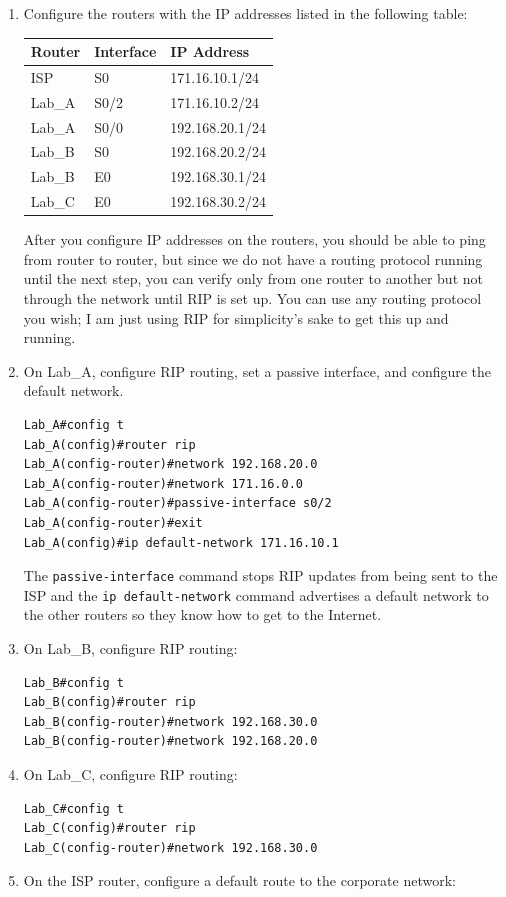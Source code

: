 \documentclass[b5paper,11pt]{memoir}
\begin{document}
\begin{enumerate}
\item
  Configure the routers with the IP addresses listed in the following
  table:

  \begin{longtable}[]{@{}lll@{}}
  \toprule
  \textbf{Router} & \textbf{Interface} & \textbf{IP
  Address}\tabularnewline
  \midrule
  \endhead
  ISP & S0 & 171.16.10.1/24\tabularnewline
  Lab\_A & S0/2 & 171.16.10.2/24\tabularnewline
  Lab\_A & S0/0 & 192.168.20.1/24\tabularnewline
  Lab\_B & S0 & 192.168.20.2/24\tabularnewline
  Lab\_B & E0 & 192.168.30.1/24\tabularnewline
  Lab\_C & E0 & 192.168.30.2/24\tabularnewline
  \bottomrule
  \end{longtable}

  After you configure IP addresses on the routers, you should be able to
  ping from router to router, but since we do not have a routing
  protocol running until the next step, you can verify only from one
  router to another but not through the network until RIP is set up. You
  can use any routing protocol you wish; I am just using RIP for
  simplicity's sake to get this up and running.
\item
  On Lab\_A, configure RIP routing, set a passive interface, and
  configure the default network.

\begin{verbatim}
Lab_A#config t
Lab_A(config)#router rip
Lab_A(config-router)#network 192.168.20.0
Lab_A(config-router)#network 171.16.0.0
Lab_A(config-router)#passive-interface s0/2
Lab_A(config-router)#exit
Lab_A(config)#ip default-network 171.16.10.1
\end{verbatim}

  The \texttt{passive-interface} command stops RIP updates from being
  sent to the ISP and the \texttt{ip\ default-network} command
  advertises a default network to the other routers so they know how to
  get to the Internet.
\item
  On Lab\_B, configure RIP routing:

\begin{verbatim}
Lab_B#config t
Lab_B(config)#router rip
Lab_B(config-router)#network 192.168.30.0
Lab_B(config-router)#network 192.168.20.0
\end{verbatim}
\item
  On Lab\_C, configure RIP routing:

\begin{verbatim}
Lab_C#config t
Lab_C(config)#router rip
Lab_C(config-router)#network 192.168.30.0
\end{verbatim}
\item
  On the ISP router, configure a default route to the corporate network:


\end{enumerate}
\end{document}
